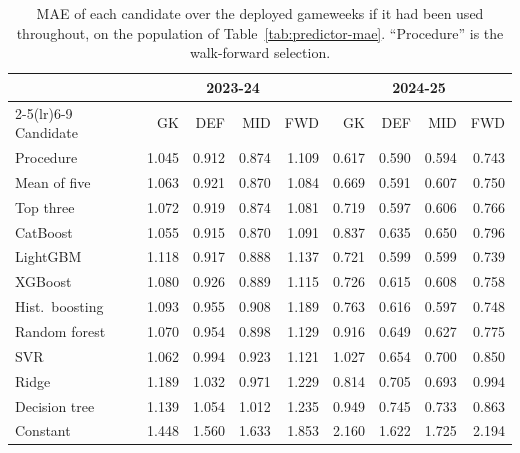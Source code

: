 \begin{table}[ht]
  \centering
  \caption{MAE of each candidate over the deployed gameweeks if it had been used throughout,
  on the population of Table~\ref{tab:predictor-mae}. ``Procedure'' is the walk-forward
  selection.}
  \label{tab:predictor-candidates}
  \small
  \setlength{\tabcolsep}{4pt}
  \begin{tabular}{lrrrrrrrr}
    \toprule
    & \multicolumn{4}{c}{2023-24} & \multicolumn{4}{c}{2024-25} \\
    \cmidrule(lr){2-5}\cmidrule(lr){6-9}
    Candidate & GK & DEF & MID & FWD & GK & DEF & MID & FWD \\
    \midrule
    Procedure          & 1.045 & 0.912 & 0.874 & 1.109 & 0.617 & 0.590 & 0.594 & 0.743 \\
    \midrule
    Mean of five       & 1.063 & 0.921 & 0.870 & 1.084 & 0.669 & 0.591 & 0.607 & 0.750 \\
    Top three          & 1.072 & 0.919 & 0.874 & 1.081 & 0.719 & 0.597 & 0.606 & 0.766 \\
    CatBoost           & 1.055 & 0.915 & 0.870 & 1.091 & 0.837 & 0.635 & 0.650 & 0.796 \\
    LightGBM           & 1.118 & 0.917 & 0.888 & 1.137 & 0.721 & 0.599 & 0.599 & 0.739 \\
    XGBoost            & 1.080 & 0.926 & 0.889 & 1.115 & 0.726 & 0.615 & 0.608 & 0.758 \\
    Hist.\ boosting    & 1.093 & 0.955 & 0.908 & 1.189 & 0.763 & 0.616 & 0.597 & 0.748 \\
    Random forest      & 1.070 & 0.954 & 0.898 & 1.129 & 0.916 & 0.649 & 0.627 & 0.775 \\
    SVR                & 1.062 & 0.994 & 0.923 & 1.121 & 1.027 & 0.654 & 0.700 & 0.850 \\
    Ridge              & 1.189 & 1.032 & 0.971 & 1.229 & 0.814 & 0.705 & 0.693 & 0.994 \\
    Decision tree      & 1.139 & 1.054 & 1.012 & 1.235 & 0.949 & 0.745 & 0.733 & 0.863 \\
    Constant           & 1.448 & 1.560 & 1.633 & 1.853 & 2.160 & 1.622 & 1.725 & 2.194 \\
    \bottomrule
  \end{tabular}
\end{table}

